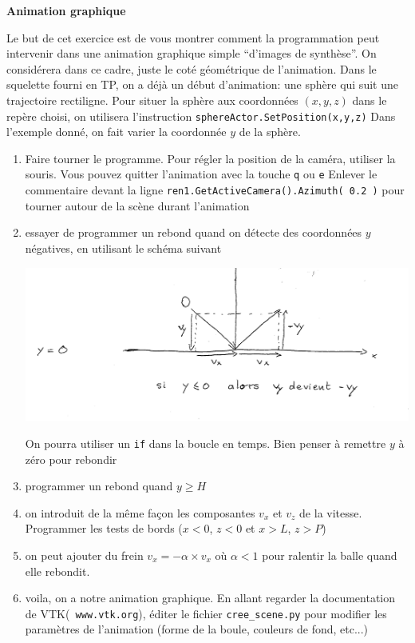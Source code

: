 \documentclass[12pt]{letter}
\begin{document}
\textbf{Animation graphique}

 Le but de cet exercice est de vous montrer comment la programmation peut intervenir dans une animation graphique simple ``d'images de synthèse''.
 On considérera dans ce cadre, juste le coté géométrique de l'animation. Dans le squelette fourni en TP, on a déjà un début d'animation: 
 une sphère qui suit une trajectoire rectiligne. 
 Pour situer la sphère aux coordonnées $(x,y,z)$ dans le repère choisi, on utilisera l'instruction \texttt{sphereActor.SetPosition(x,y,z)}
 Dans l'exemple donné, on fait varier la coordonnée $y$ de la sphère. 

 \begin{enumerate} 
 
    \item Faire tourner le programme. Pour régler la position de la caméra, utiliser
    la souris. Vous pouvez quitter l'animation avec la touche \texttt{q} ou \texttt{e}   Enlever le commentaire devant la ligne
    \texttt{ren1.GetActiveCamera().Azimuth( 0.2 )} pour tourner autour de la scène durant l'animation
    \item essayer de programmer un rebond quand on détecte des coordonnées $y$ négatives, en utilisant le schéma suivant 
   \begin{center}
     \includegraphics[width=0.8\linewidth]{rebond.pdf}
   \end{center}
   On pourra utiliser un \texttt{if} dans la boucle en temps. Bien penser à remettre $y$ à zéro pour rebondir
   \item programmer un rebond quand $y \geqslant H$
   \item on introduit de la même façon les composantes $v_x$ et $v_z$ de la vitesse. Programmer les tests de bords ($x <0$, $z < 0$ et $x > L$, $z > P$)
   \item on peut ajouter du frein $v_x = -\alpha \times v_x$ où $\alpha < 1$ pour ralentir la balle quand elle rebondit.
   \item voila, on a notre animation graphique. En allant regarder la documentation de VTK(\texttt{ www.vtk.org}), éditer le fichier \texttt{cree\_scene.py}
   pour modifier les paramètres de l'animation (forme de la boule, couleurs de fond, etc...)
  \end{enumerate}
\end{document}
